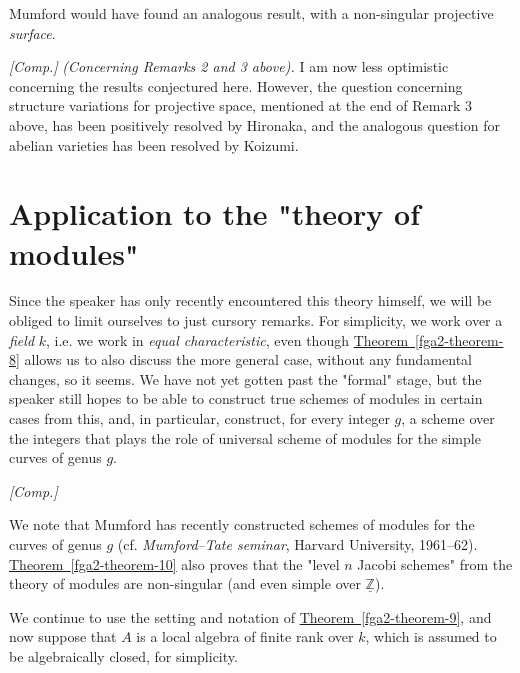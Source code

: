 \begin{remark}{}
    Mumford would have found an analogous result, with a non-singular projective \emph{surface}.\end{remark}\begin{remark}{}\label{fga2-6-remark-ii}\skipsinglepar\par{}\emph{[Comp.]}
    \emph{(Concerning Remarks 2 and 3 above).}
    I am now less optimistic concerning the results conjectured here.
    However, the question concerning structure variations for projective space, mentioned at the end of Remark 3 above, has been positively resolved by Hironaka, and the analogous question for abelian varieties has been resolved by Koizumi.\end{remark}\chapter{Application to the "theory of modules"}\thispagestyle{fancy}\label{fga2-7}\par{}Since the speaker has only recently encountered this theory himself, we will be obliged to limit ourselves to just cursory remarks.
  For simplicity, we work over a \emph{field} \(k\), i.e. we work in \emph{equal characteristic}, even though \hyperref[fga2-theorem-8]{Theorem~\ref*{fga2-theorem-8}} allows us to also discuss the more general case, without any fundamental changes, so it seems.
  We have not yet gotten past the "formal" stage, but the speaker still hopes to be able to construct true schemes of modules in certain cases from this, and, in particular, construct, for every integer \(g\), a scheme over the integers that plays the role of universal scheme of modules for the simple curves of genus \(g\).\begin{remark}{}\label{fga2-7-remark}\skipsinglepar\par{}\emph{[Comp.]}
    
    We note that Mumford has recently constructed schemes of modules for the curves of genus \(g\) (cf. \emph{Mumford–Tate seminar}, Harvard University, 1961–62).
    \hyperref[fga2-theorem-10]{Theorem~\ref*{fga2-theorem-10}} also proves that the "level \(n\) Jacobi schemes" from the theory of modules are non-singular (and even simple over \(\underline {\mathbb {Z}}\)).\end{remark}\par{}We continue to use the setting and notation of \hyperref[fga2-theorem-9]{Theorem~\ref*{fga2-theorem-9}}, and now suppose that \(A\) is a local algebra of finite rank over \(k\), which is assumed to be algebraically closed, for simplicity.
